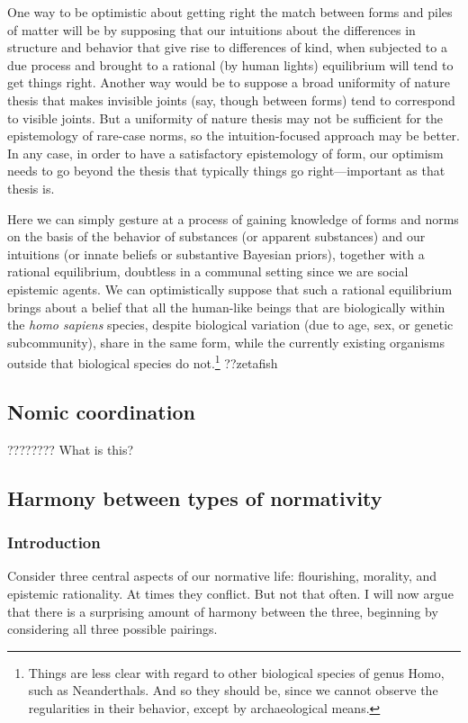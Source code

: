One way to be optimistic about getting right the match between forms and piles of matter will be by supposing that 
our intuitions about the differences in structure and behavior that give rise to differences of kind, when subjected 
to a due process and brought to a rational (by human lights) equilibrium will tend to get things right. Another way 
would be to suppose a broad uniformity of nature thesis that makes invisible joints (say, though between forms) tend to 
correspond to visible joints. But a uniformity of nature thesis may not be sufficient for the epistemology of rare-case 
norms, so the intuition-focused approach may be better. In any case, in order to have a satisfactory epistemology of form,
our optimism needs to go beyond the thesis that typically things go right---important as that thesis is.

Here we can simply gesture at a process of gaining knowledge of forms and norms on the basis of the behavior of 
substances (or apparent substances) and our intuitions (or innate beliefs or substantive Bayesian priors), together 
with a rational equilibrium, doubtless in a communal setting since we are social epistemic agents. We can optimistically
suppose that such a rational equilibrium brings about a belief that all the human-like beings that are biologically 
within the \textit{homo sapiens} species, despite biological variation (due to age, sex, or genetic subcommunity), share 
in the same form, while the currently existing organisms outside that biological species do not.\footnote{Things are less
clear with regard to other biological species of genus Homo, such as Neanderthals. And so they should be, since we cannot
observe the regularities in their behavior, except by archaeological means.} ??zetafish

\subsection{Nomic coordination}
???????? What is this?

\subsection{Harmony between types of normativity}
\subsubsection{Introduction}
Consider three central aspects of our normative life: flourishing, morality, and epistemic rationality. At times 
they conflict. But not that often. I will now argue that there is a surprising amount of harmony between the three,
beginning by considering all three possible pairings.

